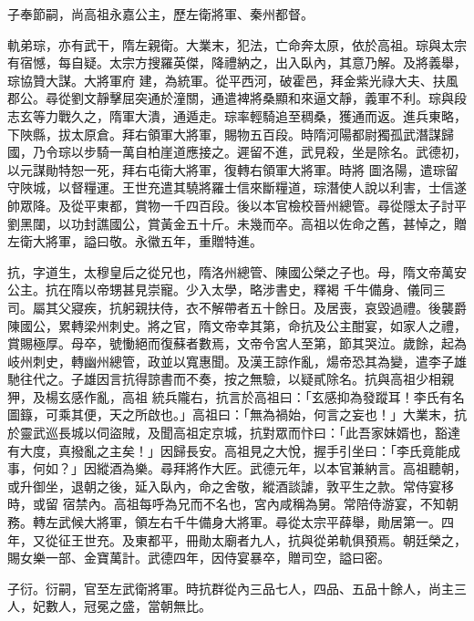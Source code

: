 \begin{pinyinscope}
 子奉節嗣，尚高祖永嘉公主，歷左衛將軍、秦州都督。



 軌弟琮，亦有武干，隋左親衛。大業末，犯法，亡命奔太原，依於高祖。琮與太宗有宿憾，每自疑。太宗方搜羅英傑，降禮納之，出入臥內，其意乃解。及將義舉，琮協贊大謀。大將軍府
 建，為統軍。從平西河，破霍邑，拜金紫光祿大夫、扶風郡公。尋從劉文靜擊屈突通於潼關，通遣裨將桑顯和來逼文靜，義軍不利。琮與段志玄等力戰久之，隋軍大潰，通遁走。琮率輕騎追至稠桑，獲通而返。進兵東略，下陜縣，拔太原倉。拜右領軍大將軍，賜物五百段。時隋河陽都尉獨孤武潛謀歸國，乃令琮以步騎一萬自柏崖道應接之。遲留不進，武見殺，坐是除名。武德初，以元謀勛特恕一死，拜右屯衛大將軍，復轉右領軍大將軍。時將
 圖洛陽，遣琮留守陜城，以督糧運。王世充遣其驍將羅士信來斷糧道，琮潛使人說以利害，士信遂帥眾降。及從平東都，賞物一千四百段。後以本官檢校晉州總管。尋從隱太子討平劉黑闥，以功封譙國公，賞黃金五十斤。未幾而卒。高祖以佐命之舊，甚悼之，贈左衛大將軍，謚曰敬。永徽五年，重贈特進。



 抗，字道生，太穆皇后之從兄也，隋洛州總管、陳國公榮之子也。母，隋文帝萬安公主。抗在隋以帝甥甚見崇寵。少入太學，略涉書史，釋褐
 千牛備身、儀同三司。屬其父寢疾，抗躬親扶侍，衣不解帶者五十餘日。及居喪，哀毀過禮。後襲爵陳國公，累轉梁州刺史。將之官，隋文帝幸其第，命抗及公主酣宴，如家人之禮，賞賜極厚。母卒，號慟絕而復蘇者數焉，文帝令宮人至第，節其哭泣。歲餘，起為岐州刺史，轉幽州總管，政並以寬惠聞。及漢王諒作亂，煬帝恐其為變，遣李子雄馳往代之。子雄因言抗得諒書而不奏，按之無驗，以疑貳除名。抗與高祖少相親狎，及楊玄感作亂，高祖
 統兵隴右，抗言於高祖曰：「玄感抑為發蹤耳！李氏有名圖籙，可乘其便，天之所啟也。」高祖曰：「無為禍始，何言之妄也！」大業末，抗於靈武巡長城以伺盜賊，及聞高祖定京城，抗對眾而忭曰：「此吾家妹婿也，豁達有大度，真撥亂之主矣！」因歸長安。高祖見之大悅，握手引坐曰：「李氏竟能成事，何如？」因縱酒為樂。尋拜將作大匠。武德元年，以本官兼納言。高祖聽朝，或升御坐，退朝之後，延入臥內，命之舍敬，縱酒談謔，敦平生之款。常侍宴移時，或留
 宿禁內。高祖每呼為兄而不名也，宮內咸稱為舅。常陪侍游宴，不知朝務。轉左武候大將軍，領左右千牛備身大將軍。尋從太宗平薛舉，勛居第一。四年，又從征王世充。及東都平，冊勛太廟者九人，抗與從弟軌俱預焉。朝廷榮之，賜女樂一部、金寶萬計。武德四年，因侍宴暴卒，贈司空，謚曰密。



 子衍。衍嗣，官至左武衛將軍。時抗群從內三品七人，四品、五品十餘人，尚主三人，妃數人，冠冕之盛，當朝無比。




\end{pinyinscope}

